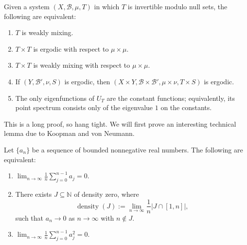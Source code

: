 \documentclass[11pt,a4paper]{article}
\begin{document}
\setcounter{theorem}{14}\begin{theorem}
\label{thm:l4-mixing-equivalences}
Given a system $(X,\mathcal B,\mu,T)$ in which $T$ is invertible modulo null sets, the following are equivalent:
\begin{enumerate}[label=(\arabic*)]
 \setcounter{enumi}{0}\item $T$ is weakly mixing.
 \setcounter{enumi}{1}\item $T\times T$ is ergodic with respect to $\mu\times\mu$.
 \setcounter{enumi}{2}\item $T\times T$ is weakly mixing with respect to $\mu\times\mu$.
 \setcounter{enumi}{3}\item If $(Y,\mathcal B',\nu,S)$ is ergodic, then
 $(X\times Y,\mathcal B\times\mathcal B',\mu\times\nu,T\times S)$
 is ergodic.
 \setcounter{enumi}{4}\item The only eigenfunctions of $U_T$ are the constant functions; equivalently, its point spectrum consists only of the eigenvalue $1$ on the constants.
\end{enumerate}
\end{theorem}
This is a long proof, so hang tight. We will first prove an interesting
technical lemma due to Koopman and von Neumann.

\setcounter{theorem}{15}\begin{lemma}
\label{lem:l4-koopman-neumann}
Let $\{a_n\}$ be a sequence of bounded nonnegative real numbers.
The following are equivalent:
\begin{enumerate}[label=(\roman*)]
 \setcounter{enumi}{0}\item $\displaystyle\lim_{n\to\infty}\frac1n\sum_{j=0}^{n-1}a_j=0$.
 \setcounter{enumi}{1}\item There exists $J\subseteq\mathbb N$ of density zero, where
 \[
  \operatorname{density}(J):=
  \lim_{n\to\infty}\frac1n|J\cap[1,n]|,
 \]
 such that $a_n\to0$ as $n\to\infty$ with $n\notin J$.
 \setcounter{enumi}{2}\item $\displaystyle\lim_{n\to\infty}\frac1n\sum_{j=0}^{n-1}a_j^2=0$.
\end{enumerate}
\end{lemma}
\end{document}
